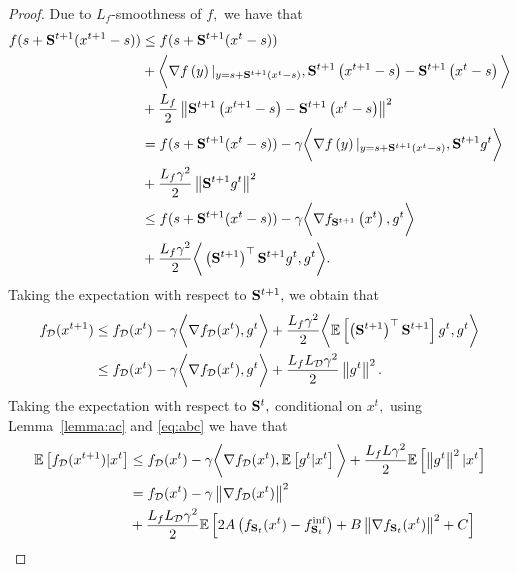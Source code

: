 \documentclass{article}
\newcommand{\bb}{\mathbb}
\newcommand{\Exp}[1]{{\bb E}\left[#1\right]}
\theoremstyle{plain}
\newcommand{\tf}{f_{\mathcal{D}}}
\newcommand{\mS}{{\bf S}}
\theoremstyle{plain}
\theoremstyle{definition}
\theoremstyle{remark}
\begin{document}
\begin{proof}
	Due to $L_f$-smoothness of $f,$ we have that
	\begin{equation*}
		\begin{split}
			f(s+\mS^{t+1}(x^{t+1} - s)) &\leq f(s+\mS^{t+1}(x^{t} - s))\\
			& + \bigg{<} \nabla f\left(y\right)|_{y=s+\mS^{t+1}(x^t-s)}, \mS^{t+1}\left(x^{t+1} - s\right) - \mS^{t+1}\left(x^t-s\right) \bigg{>}\\
			& + \frac{L_f}{2}\left\|\mS^{t+1}\left(x^{t+1} - s\right) - \mS^{t+1}\left(x^t-s\right) \right\|^2\\
			& = f(s+\mS^{t+1}(x^{t} - s)) -\gamma \bigg{<} \nabla f\left(y\right)|_{y=s+\mS^{t+1}(x^t-s)}, \mS^{t+1}g^t \bigg{>}\\
                & + \frac{L_f\gamma^2}{2}\left\|\mS^{t+1}g^t \right\|^2\\
			& \leq f(s+\mS^{t+1}(x^{t} - s))-\gamma \bigg{<} \nabla f_{\mS^{t+1}}\left(x^t\right), g^t \bigg{>}\\
                & + \frac{L_f\gamma^2}{2}\bigg{<} \left(\mS^{t+1}\right)^{\top}\mS^{t+1}g^t, g^t \bigg{>}.\\
		\end{split}
	\end{equation*}
	Taking the expectation with respect to $\mS^{t+1},$ we obtain that
	\begin{equation*}
		\begin{split}
			\tf(x^{t+1}) & \leq \tf(x^t)-\gamma  \bigg{<} \nabla\tf(x^t), g^t \bigg{>} + \frac{L_f\gamma^2}{2}\bigg{<} \Exp{\left(\mS^{t+1}\right)^{\top}\mS^{t+1}}g^t, g^t \bigg{>}\\
			& \leq \tf(x^t)-\gamma  \bigg{<} \nabla\tf(x^t), g^t \bigg{>} + \frac{L_fL_{\mathcal{D}}\gamma^2}{2}\left\|g^t\right\|^2.\\
		\end{split}
	\end{equation*}
	Taking the expectation with respect to $\mS^{t},$ conditional on $x^t,$ using Lemma~\ref{lemma:ac} and \eqref{eq:abc} we have that
	\begin{equation*}
		\begin{split}
			\Exp{\tf(x^{t+1})|x^t} & \leq \tf(x^t)-\gamma  \bigg{<} \nabla\tf(x^t), \Exp{g^t|x^t} \bigg{>} + \frac{L_fL\gamma^2}{2}\Exp{\left\|g^t\right\|^2|x^t}\\
			& = \tf(x^t)-\gamma  \left\|\nabla\tf(x^t)\right\|^2\\
                & + \frac{L_fL_{\mathcal{D}}\gamma^2}{2}\Exp{2A\left(f_{\mS_t}(x^t) - f^{\inf}_{\mS_t}\right) + B\left\|\nabla f_{\mS_t}(x^t)\right\|^2 + C}\\

\end{split}
\end{equation*}
\end{proof}
\end{document}
